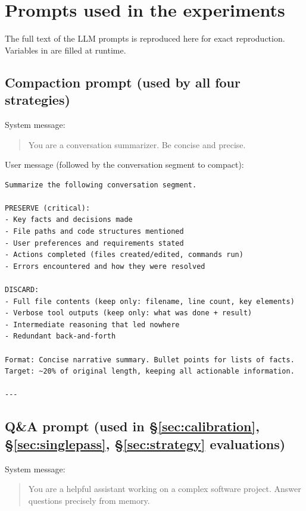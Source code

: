 \section{Prompts used in the experiments}
\label{sec:appendix-prompts}

The full text of the LLM prompts is reproduced here for exact reproduction.
Variables in  are filled at runtime.

\subsection{Compaction prompt (used by all four strategies)}
\label{sec:prompt-compaction}

System message:

\begin{quote}
You are a conversation summarizer. Be concise and precise.
\end{quote}

User message (followed by the conversation segment to compact):

\begin{lstlisting}
Summarize the following conversation segment.

PRESERVE (critical):
- Key facts and decisions made
- File paths and code structures mentioned
- User preferences and requirements stated
- Actions completed (files created/edited, commands run)
- Errors encountered and how they were resolved

DISCARD:
- Full file contents (keep only: filename, line count, key elements)
- Verbose tool outputs (keep only: what was done + result)
- Intermediate reasoning that led nowhere
- Redundant back-and-forth

Format: Concise narrative summary. Bullet points for lists of facts.
Target: ~20% of original length, keeping all actionable information.

---
\end{lstlisting}

\subsection{Q\&A prompt (used in \S\ref{sec:calibration}, \S\ref{sec:singlepass}, \S\ref{sec:strategy} evaluations)}
\label{sec:prompt-qa}

System message:

\begin{quote}
You are a helpful assistant working on a complex software project.
Answer questions precisely from memory.
\end{quote}

